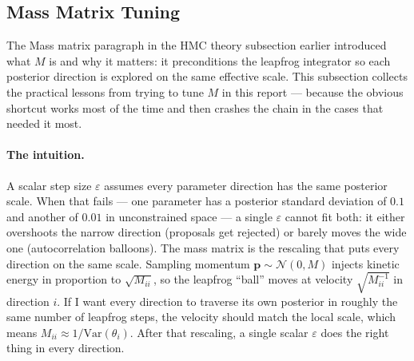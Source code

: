 \documentclass{article}
\renewcommand{\v}[1]{ \ensuremath{ {\mathbf{#1}} }}
\begin{document}
\subsection{Mass Matrix Tuning}
\label{sec:mass-matrix-tuning}

The Mass matrix paragraph in the HMC theory subsection earlier introduced what $M$ is and why it matters: it preconditions the leapfrog integrator so each posterior direction is explored on the same effective scale. This subsection collects the practical lessons from trying to tune $M$ in this report --- because the obvious shortcut works most of the time and then crashes the chain in the cases that needed it most.

\paragraph{The intuition.}
A scalar step size $\varepsilon$ assumes every parameter direction has the same posterior scale. When that fails --- one parameter has a posterior standard deviation of $0.1$ and another of $0.01$ in unconstrained space --- a single $\varepsilon$ cannot fit both: it either overshoots the narrow direction (proposals get rejected) or barely moves the wide one (autocorrelation balloons). The mass matrix is the rescaling that puts every direction on the same scale. Sampling momentum $\v p \sim \mathcal{N}(0, M)$ injects kinetic energy in proportion to $\sqrt{M_{ii}}$, so the leapfrog ``ball'' moves at velocity $\sqrt{M^{-1}_{ii}}$ in direction $i$. If I want every direction to traverse its own posterior in roughly the same number of leapfrog steps, the velocity should match the local scale, which means $M_{ii} \approx 1 / \mathrm{Var}(\theta_i)$. After that rescaling, a single scalar $\varepsilon$ does the right thing in every direction.
\end{document}

